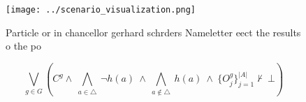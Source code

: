 \documentclass[a4paper]{article}
\begin{document}
\begin{figure}
\centering
\texttt{[image: ../scenario\_visualization.png]}
\caption{Particle or in chancellor gerhard schrders Nameletter eect the results o the po
}
\end{figure}
 
\[\bigvee_{g\in G} (C^g \wedge\ \bigwedge_{a\in \triangle}\ \neg h(a)\ \wedge\ \bigwedge_{a\notin \triangle}\ h(a)\ \wedge\ \{O_j^g\}_{j=1}^{|A|} \nvdash\ \bot )\]
\end{document}
